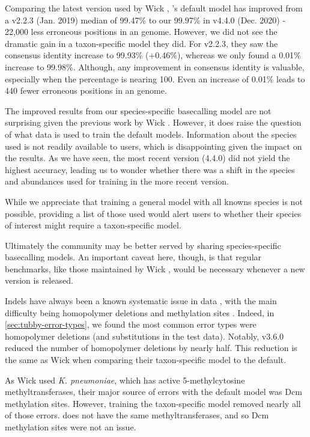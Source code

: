 Comparing the latest version used by Wick \etal{}, \guppy{}'s default model has improved from a v2.2.3 (Jan. 2019) median of 99.47\% to our 99.97\% in v4.4.0 (Dec. 2020) - 22,000 less erroneous positions in an \mtb{} genome. However, we did not see the dramatic gain in a taxon-specific model they did. For \guppy{} v2.2.3, they saw the consensus identity increase to 99.93\% (+0.46\%), whereas we only found a 0.01\% increase to 99.98\%. Although, any improvement in consensus identity is valuable, especially when the percentage is nearing 100. Even an increase of 0.01\% leads to 440 fewer erroneous positions in an \mtb{} genome.

\noindent
The improved results from our species-specific basecalling model are not surprising given the previous work by Wick \etal{} \cite{wick2019}. However, it does raise the question of what data is used to train the default \guppy{} models. Information about the species used is not readily available to users, which is disappointing given the impact on the results. As we have seen, the most recent \guppy{} version (4.4.0) did not yield the highest accuracy, leading us to wonder whether there was a shift in the species and abundances used for training in the more recent version.

While we appreciate that training a general model with all knowns species is not possible, providing a list of those used would alert users to whether their species of interest might require a taxon-specific model.

Ultimately the \ont{} community may be better served by sharing species-specific basecalling models. An important caveat here, though, is that regular benchmarks, like those maintained by Wick \etal{} \cite{wick2019,wick2020}, would be necessary whenever a new \guppy{} version is released. 

\noindent
Indels have always been a known systematic issue in \ont{} data \cite{watson2019}, with the main difficulty being homopolymer deletions and methylation sites \cite{wick2019,jain2018}. Indeed, in \autoref{sec:tubby-error-types}, we found the most common error types were homopolymer deletions (and substitutions in the test data). Notably, \tubby{} v3.6.0 reduced the number of homopolymer deletions by nearly half. This reduction is the same as Wick \etal{} when comparing their taxon-specific model to the default. 

As Wick \etal{} used \textit{K. pneumoniae}, which has active 5-methylcytosine methyltransferases, their major source of errors with the default \guppy{} model was Dcm methylation sites. However, training the taxon-specific model removed nearly all of those errors. \mtb{} does not have the same methyltransferases, and so Dcm methylation sites were not an issue.

